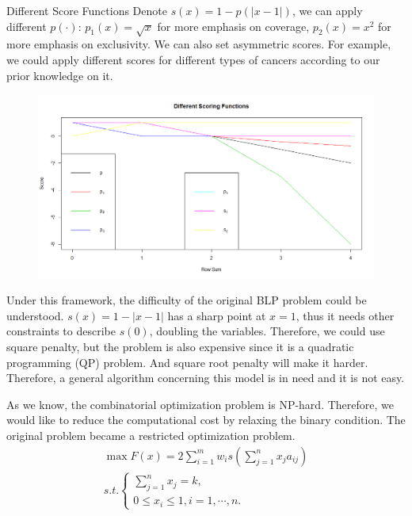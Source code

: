 \documentclass[xcolor=dvipsnames]{beamer}
\begin{document}
\begin{frame}{Different Score Functions}
Denote $s(x)=1-p(|x-1|)$, we can apply different $p(\cdot)$: $p_1(x)=\sqrt{x}$ for more emphasis on coverage, $p_2(x)=x^2$ for more emphasis on exclusivity. We can also set asymmetric scores. For example, we could apply different scores for different types of cancers according to our prior knowledge on it.\\
\begin{figure}
\centering
\includegraphics[width=0.8\linewidth]{diffscores.png}
\end{figure}
\end{frame}
\begin{frame}
Under this framework, the difficulty of the original BLP problem could be understood. $s(x)=1-|x-1|$ has a sharp point at $x=1$, thus it needs other constraints to describe $s(0)$, doubling the variables. Therefore, we could use square penalty, but the problem is also expensive since it is a quadratic programming (QP) problem. And square root penalty will make it harder.\\
Therefore, a general algorithm concerning this model is in need and it is not easy.\\
\end{frame}
\begin{frame}
As we know, the combinatorial optimization problem is NP-hard. Therefore, we would like to reduce the computational cost by relaxing the binary condition. The original problem became a restricted optimization problem.\\
\begin{eqnarray}
\max F(x)=2\sum_{i=1}^mw_is(\sum_{j=1}^nx_ja_{ij})\nonumber\\
s.t.
\left\{
\begin{array}{c}
\sum_{j=1}^nx_j=k,\\
0\leqslant x_i\leqslant1,i=1,\cdots,n.
\end{array}
\right.\nonumber
\end{eqnarray}
\end{frame}
\end{document}

